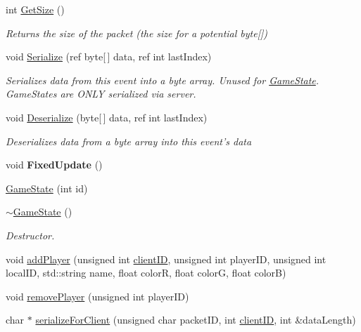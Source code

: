 \begin{DoxyCompactItemize}
\item 
int \hyperlink{class_game_state_a57d152b243c11aa86e7ba0f07b4bd0dd}{Get\-Size} ()
\begin{DoxyCompactList}\small\item\em Returns the size of the packet (the size for a potential byte\mbox{[}\mbox{]}) \end{DoxyCompactList}\item 
void \hyperlink{class_game_state_af57a06c77a763e8b57841bab79c9b12f}{Serialize} (ref byte\mbox{[}$\,$\mbox{]} data, ref int last\-Index)
\begin{DoxyCompactList}\small\item\em Serializes data from this event into a byte array. Unused for \hyperlink{class_game_state}{Game\-State}. Game\-States are O\-N\-L\-Y serialized via server. \end{DoxyCompactList}\item 
void \hyperlink{class_game_state_aa5f956de2c49182fbe5fc32e9d2ca431}{Deserialize} (byte\mbox{[}$\,$\mbox{]} data, ref int last\-Index)
\begin{DoxyCompactList}\small\item\em Deserializes data from a byte array into this event's data \end{DoxyCompactList}\item 
\hypertarget{class_game_state_a268b639f06e4fa7fa1ca1819cc5d3175}{void {\bfseries Fixed\-Update} ()}\label{class_game_state_a268b639f06e4fa7fa1ca1819cc5d3175}

\item 
\hyperlink{class_game_state_a74a35fb7045c0eee7e68f07c387e2ddf}{Game\-State} (int id)
\item 
\hypertarget{class_game_state_ae623df5042cd0c17daa3394fdcb397b3}{\hyperlink{class_game_state_ae623df5042cd0c17daa3394fdcb397b3}{$\sim$\-Game\-State} ()}\label{class_game_state_ae623df5042cd0c17daa3394fdcb397b3}

\begin{DoxyCompactList}\small\item\em Destructor. \end{DoxyCompactList}\item 
void \hyperlink{class_game_state_ad74bf5767b052d5b32805220ca0c1fab}{add\-Player} (unsigned int \hyperlink{class_game_state_ad24a423ba6655fc6541b2f12ce98e0d0}{client\-I\-D}, unsigned int player\-I\-D, unsigned int local\-I\-D, std\-::string name, float color\-R, float color\-G, float color\-B)
\item 
void \hyperlink{class_game_state_a733fa68895adba783b0b4b804f16906f}{remove\-Player} (unsigned int player\-I\-D)
\item 
char $\ast$ \hyperlink{class_game_state_a291fcda337b1a25c21871fe338399c27}{serialize\-For\-Client} (unsigned char packet\-I\-D, int \hyperlink{class_game_state_ad24a423ba6655fc6541b2f12ce98e0d0}{client\-I\-D}, int \&data\-Length)
\end{DoxyCompactItemize}
